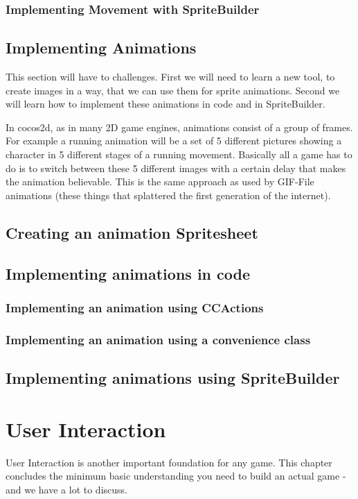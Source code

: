 \documentclass{scrreprt}
\newcommand{\cocos}{cocos2d}
\newcommand{\spriteb}{SpriteBuilder}
\begin{document}
\subsection{Implementing Movement with \spriteb{}}

\section{Implementing Animations}
This section will have to challenges. First we will need to learn a new tool, to
create images in a way, that we can use them for sprite animations. Second we
will learn how to implement these animations in code and in \spriteb{}.

In \cocos{}, as in many 2D game engines, animations consist of a group of
frames. For example a running animation will be a set of 5 different pictures
showing a character in 5 different stages of a running movement. Basically all a
game has to do is to switch between these 5 different images with a certain
delay that makes the animation believable. This is the same approach as used by
GIF-File animations (these things that splattered the first generation of the
internet).

\section{Creating an animation Spritesheet}
\section{Implementing animations in code}
\subsection{Implementing an animation using CCActions}
\subsection{Implementing an animation using a convenience class}
\section{Implementing animations using \spriteb{}}

\chapter{User Interaction}
User Interaction is another important foundation for any game. This chapter
concludes the minimum basic understanding you need to build an actual game - and
we have a lot to discuss.
\end{document}
